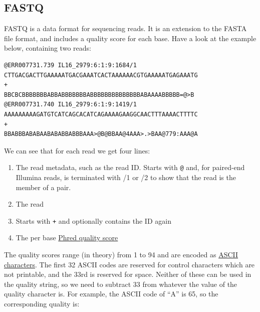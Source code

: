 \documentclass[11pt]{article}
\makeatletter
\providecommand{\tightlist}{%
      \setlength{\itemsep}{0pt}\setlength{\parskip}{0pt}}
\newcommand{\boxspacing}{\kern\kvtcb@left@rule\kern\kvtcb@boxsep}
\newcommand{\prompt}[4]{
        {\ttfamily\llap{{\color{blue}\LARGE\faKeyboardO\hspace{3pt}#4}}\vspace{-\baselineskip}}
    }
\makeatother
\begin{document}
    \begin{tcolorbox}[breakable, size=fbox, boxrule=1pt, pad at break*=1mm,colback=cellbackground, colframe=cellborder]
\prompt{In}{incolor}{ }{\boxspacing}
\begin{Verbatim}[commandchars=\\\{\}]

\end{Verbatim}
\end{tcolorbox}

    \hypertarget{fastq}{%
\subsection{FASTQ}\label{fastq}}

FASTQ is a data format for sequencing reads. It is an extension to the
FASTA file format, and includes a quality score for each base. Have a
look at the example below, containing two reads:

\begin{verbatim}
@ERR007731.739 IL16_2979:6:1:9:1684/1
CTTGACGACTTGAAAAATGACGAAATCACTAAAAAACGTGAAAAATGAGAAATG
+
BBCBCBBBBBBBABBABBBBBBBABBBBBBBBBBBBBBABAAAABBBBB=@>B
@ERR007731.740 IL16_2979:6:1:9:1419/1
AAAAAAAAAGATGTCATCAGCACATCAGAAAAGAAGGCAACTTTAAAACTTTTC
+
BBABBBABABAABABABBABBBAAA>@B@BBAA@4AAA>.>BAA@779:AAA@A
\end{verbatim}

We can see that for each read we get four lines:

\begin{enumerate}
\def\labelenumi{\arabic{enumi}.}
\tightlist
\item
  The read metadata, such as the read ID. Starts with \texttt{@} and,
  for paired-end Illumina reads, is terminated with /1 or /2 to show
  that the read is the member of a pair.
\item
  The read
\item
  Starts with \texttt{+} and optionally contains the ID again
\item
  The per base
  \href{https://en.wikipedia.org/wiki/Phred_quality_score}{Phred quality
  score}
\end{enumerate}

The quality scores range (in theory) from 1 to 94 and are encoded as
\href{https://en.wikipedia.org/wiki/ASCII}{ASCII characters}. The first
32 ASCII codes are reserved for control characters which are not
printable, and the 33rd is reserved for space. Neither of these can be
used in the quality string, so we need to subtract 33 from whatever the
value of the quality character is. For example, the ASCII code of ``A''
is 65, so the corresponding quality is:
\end{document}
